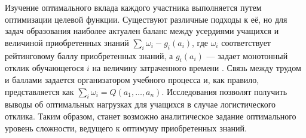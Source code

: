 Изучение оптимального вклада каждого участника выполняется путем оптимизации целевой функции. 
Существуют различные подходы к её, но для задач
образования наиболее актуален баланс между усердиями учащихся и величиной приобретенных 
знаний $\sum_{i} \omega_i - g_i(a_i)$, где $\omega_i$ соответствует рейтинговому баллу
приобретенных знаний, а $g_i(a_i)$ --- задает монотонный отклик обучающегося $i$ на величину затраченного времени \cite{holmstrom1982moral}. Связь между трудом и баллами задается
организатором учебного процесса и, как правило, представляется как $\sum_{i} \omega_i = Q(a_1,\dots,a_n)$. Исследования позволят получить выводы об оптимальных нагрузках для учащихся
в случае логистического отклика. Таким образом, станет возможно аналитическое задание оптимального уровень сложности, ведущего к оптимуму приобретенных знаний. 


